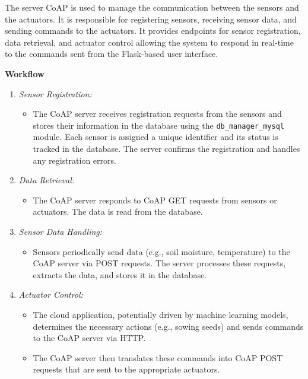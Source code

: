 The server CoAP is used to manage the communication between the sensors and the actuators. It is responsible for registering sensors, receiving sensor data, and sending commands to the actuators. It provides endpoints for sensor registration, data retrieval, and actuator control allowing the system to respond in real-time to the commands sent from the Flask-based user interface.



\textbf{Workflow}
\begin{enumerate}
    \item \textit{Sensor Registration:} 
    \begin{itemize}
        \item The CoAP server receives registration requests from the sensors and stores their information in the database using the \texttt{db\_manager\_mysql} module. Each sensor is assigned a unique identifier and its status is tracked in the database. The server confirms the registration and handles any registration errors.
    \end{itemize}
    
    \item \textit{Data Retrieval:}
    \begin{itemize}
        \item The CoAP server responds to CoAP GET requests from sensors or actuators. The data is read from the database.
    \end{itemize}

    \item \textit{Sensor Data Handling:} 
    \begin{itemize}
        \item Sensors periodically send data (e.g., soil moisture, temperature) to the CoAP server via POST requests. The server processes these requests, extracts the data, and stores it in the database.
    \end{itemize}
    
    \item \textit{Actuator Control:} 
    \begin{itemize}
        \item The cloud application, potentially driven by machine learning models, determines the necessary actions (e.g., sowing seeds) and sends commands to the CoAP server via HTTP.
        \item The CoAP server then translates these commands into CoAP POST requests that are sent to the appropriate actuators. 
    \end{itemize}
    

\end{enumerate}
